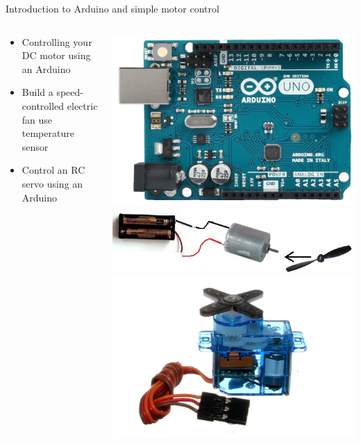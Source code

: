 \documentclass[compress]{beamer}
\begin{document}
\begin{frame}{Introduction to Arduino and simple motor control}
    \begin{columns}
        \begin{column}{0.45\linewidth}

            \begin{itemize}
                \item Controlling your DC motor using an Arduino
                \item Build a speed-controlled electric fan \eg use
                    temperature sensor

                \item Control an RC servo using an Arduino
            \end{itemize}
        \end{column}
        \begin{column}{0.45\linewidth}

            \begin{center}
                \includegraphics[width=0.8\columnwidth]{arduino-uno}\\
                \includegraphics[width=0.8\columnwidth]{dc-motor-fan}\\
                \includegraphics[width=0.8\columnwidth]{servo}\\
            \end{center}


\end{column}
\end{columns}
\end{frame}
\end{document}
